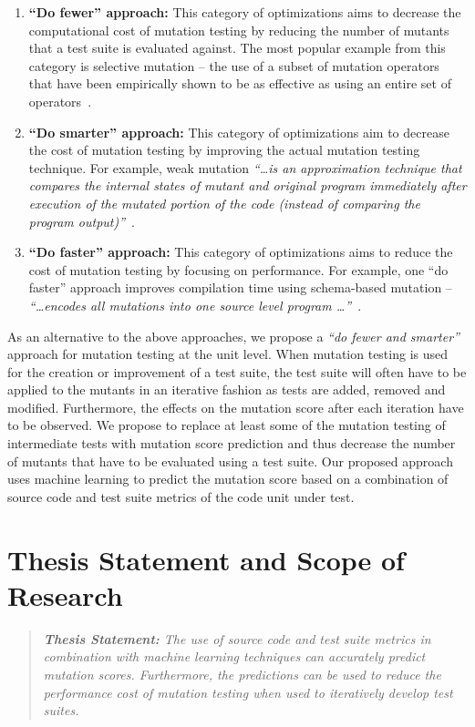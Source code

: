 \begin{enumerate}
  \item \textbf{``Do fewer'' approach:} This category of optimizations aims to decrease the computational cost of mutation testing by reducing the number of mutants that a test suite is evaluated against. The most popular example from this category is selective mutation -- the use of a subset of mutation operators that have been empirically shown to be as effective as using an entire set of operators~\cite{OLR+96}.

  \item \textbf{``Do smarter'' approach:} This category of optimizations aim to decrease the cost of mutation testing by improving the actual mutation testing technique. For example, weak mutation \emph{``\ldots is an approximation technique that compares the internal states of mutant and original program immediately after execution of the mutated portion of the code (instead of comparing the program output)''}~\cite{OU01}.

  \item \textbf{``Do faster'' approach:} This category of optimizations aims to reduce the cost of mutation testing by focusing on performance. For example, one ``do faster'' approach improves compilation time using schema-based mutation -- \emph{``\ldots encodes all mutations into one source level program \ldots''}~\cite{OU01}.
\end{enumerate}

As an alternative to the above approaches, we propose a \emph{``do fewer and smarter''} approach for mutation testing at the unit level. When mutation testing is used for the creation or improvement of a test suite, the test suite will often have to be applied to the mutants in an iterative fashion as tests are added, removed and modified. Furthermore, the effects on the mutation score after each iteration have to be observed. We propose to replace at least some of the mutation testing of intermediate tests with mutation score prediction and thus decrease the number of mutants that have to be evaluated using a test suite. Our proposed approach uses machine learning to predict the mutation score based on a combination of source code and test suite metrics of the code unit under test.


\section{Thesis Statement and Scope of Research}
\label{sec:introduction_statement_and_scope}
\begin{quote}
  \emph{\textbf{Thesis Statement:} The use of source code and test suite metrics in combination with machine learning techniques can accurately predict mutation scores. Furthermore, the predictions can be used to reduce the performance cost of mutation testing when used to iteratively develop test suites.}
\end{quote}

